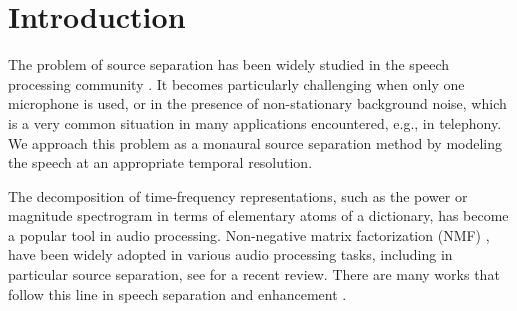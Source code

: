 \section{Introduction}

The problem of source separation has been widely
studied in the speech processing community \cite{loizou2007speech,hansler2008speech}. 
It becomes particularly challenging when only one microphone is used, or in the presence of 
non-stationary background noise, which is a very common situation in many applications encountered, e.g., in telephony.
We approach this problem as a monaural source separation method
by modeling the speech at an appropriate temporal resolution.

The decomposition of time-frequency representations, such as the power or magnitude spectrogram
in terms of elementary atoms of a dictionary, has become a popular tool in audio processing. 
Non-negative matrix factorization (NMF) \cite{NMF, smaragdis2006probabilistic},
have been widely adopted in various audio processing tasks, including in particular source separation, see \cite{smaragdis2014static} for a recent review. 
There are many works that follow this line in speech separation \cite{schmidt06speechseparation,shashanka_icassp07} and enhancement \cite{JoderWEVS12,DuanMS12,schmidt07mlsp,mohammadiha2013supervised}. %

%

